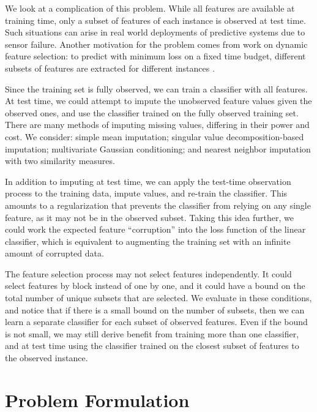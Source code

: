 We look at a complication of this problem.
While all features are available at training time, only a subset of features of each instance is observed at test time.
Such situations can arise in real world deployments of predictive systems due to sensor failure.
Another motivation for the problem comes from work on dynamic feature selection: to predict with minimum loss on a fixed time budget, different subsets of features are extracted for different instances \cite{Karayev-NIPS-2012, Xu-ICML-2013}.

Since the training set is fully observed, we can train a classifier with all features.
At test time, we could attempt to impute the unobserved feature values given the observed ones, and use the classifier trained on the fully observed training set.
There are many methods of imputing missing values, differing in their power and cost.
We consider: simple mean imputation; singular value decomposition-based imputation; multivariate Gaussian conditioning; and nearest neighbor imputation with two similarity measures.

In addition to imputing at test time, we can apply the test-time observation process to the training data, impute values, and re-train the classifier.
This amounts to a regularization that prevents the classifier from relying on any single feature, as it may not be in the observed subset.
Taking this idea further, we could work the expected feature ``corruption'' into the loss function of the linear classifier, which is equivalent to augmenting the training set with an infinite amount of corrupted data.

The feature selection process may not select features independently.
It could select features by block instead of one by one, and it could have a bound on the total number of unique subsets that are selected.
We evaluate in these conditions, and notice that if there is a small bound on the number of subsets, then we can learn a separate classifier for each subset of observed features.
Even if the bound is not small, we may still derive benefit from training more than one classifier, and at test time using the classifier trained on the closest subset of features to the observed instance.

\section{Problem Formulation}

